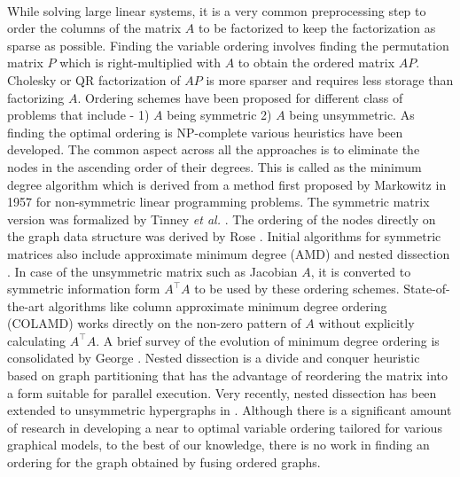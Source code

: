 \paragraph{}
While solving large linear systems, it is a very common preprocessing step to order the columns of the matrix $A$ to be factorized to keep the factorization as sparse as possible. Finding the variable ordering involves finding the permutation matrix $P$ which is right-multiplied with $A$ to obtain the ordered matrix $AP$. Cholesky or QR factorization of $AP$ is more sparser and requires less storage than factorizing $A$. Ordering schemes have been proposed for different class of problems that include - 1) $A$ being symmetric 2) $A$ being unsymmetric. As finding the optimal ordering is NP-complete \cite{orderingnphard} various heuristics have been developed. The common aspect across all the approaches is to eliminate the nodes in the ascending order of their degrees. This is called as the minimum degree algorithm which is derived from a method first proposed by Markowitz in 1957 \cite{markowitzelimination} for non-symmetric linear programming problems. The symmetric matrix version was formalized by Tinney \textit{et al.} \cite{tinneyfirstordering}. The ordering of the nodes directly on the graph data structure was derived by Rose \cite{rosegraph}. Initial algorithms for symmetric matrices also include approximate minimum degree (AMD) \cite{amd} and nested dissection \cite{nesdis}. In case of the unsymmetric matrix such as Jacobian $A$, it is converted to symmetric information form $A^\top A$ to be used by these ordering schemes. State-of-the-art algorithms like column approximate minimum degree ordering (COLAMD) \cite{colamd} works directly on the non-zero pattern of $A$ without explicitly calculating $A^\top A$. A brief survey of the evolution of minimum degree ordering is consolidated by George \cite{georgeevolution}. Nested dissection is a divide and conquer heuristic based on graph partitioning that has the advantage of reordering the matrix into a form suitable for parallel execution. Very recently, nested dissection has been extended to unsymmetric hypergraphs in \cite{hund}. Although there is a significant amount of research in developing a near to optimal variable ordering tailored for various graphical models, to the best of our knowledge, there is no work in finding an ordering for the graph obtained by fusing ordered graphs. 

